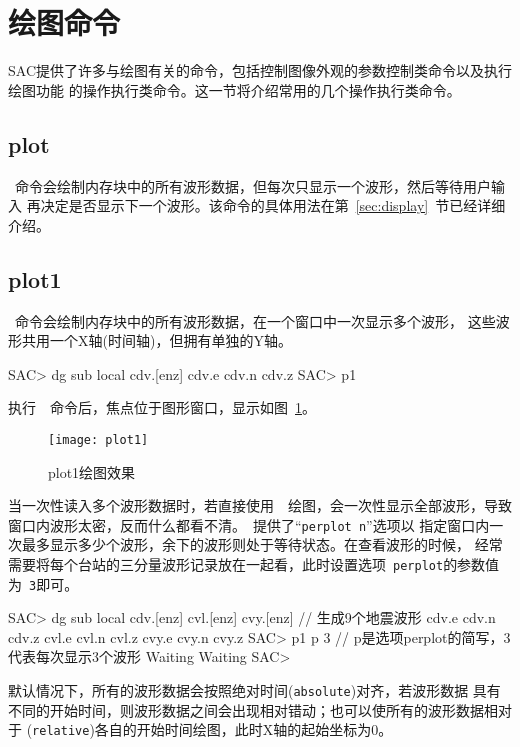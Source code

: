 \section{绘图命令}
SAC提供了许多与绘图有关的命令，包括控制图像外观的参数控制类命令以及执行绘图功能
的操作执行类命令。这一节将介绍常用的几个操作执行类命令。

\subsection{plot}
~命令会绘制内存块中的所有波形数据，但每次只显示一个波形，然后等待用户输入
再决定是否显示下一个波形。该命令的具体用法在第~\ref{sec:display}~节已经详细介绍。

\subsection{plot1}
~命令会绘制内存块中的所有波形数据，在一个窗口中一次显示多个波形，
这些波形共用一个X轴(时间轴)，但拥有单独的Y轴。

\begin{SACCode}
SAC> dg sub local cdv.[enz]
cdv.e cdv.n cdv.z
SAC> p1
\end{SACCode}

执行~~命令后，焦点位于图形窗口，显示如图~\ref{fig:plot1}。
\begin{figure}[H]
\centering
\texttt{[image: plot1]}
\caption{plot1绘图效果}
\label{fig:plot1}
\end{figure}

当一次性读入多个波形数据时，若直接使用~~绘图，会一次性显示全部波形，导致
窗口内波形太密，反而什么都看不清。~提供了``\verb+perplot n+''选项以
指定窗口内一次最多显示多少个波形，余下的波形则处于等待状态。在查看波形的时候，
经常需要将每个台站的三分量波形记录放在一起看，此时设置选项~\verb+perplot+的参数值为~\verb+3+即可。
\begin{SACCode}
SAC> dg sub local cdv.[enz] cvl.[enz] cvy.[enz]  // 生成9个地震波形
cdv.e cdv.n cdv.z cvl.e cvl.n cvl.z cvy.e cvy.n cvy.z
SAC> p1 p 3         // p是选项perplot的简写，3代表每次显示3个波形
Waiting
Waiting
SAC>
\end{SACCode}

默认情况下，所有的波形数据会按照绝对时间(\verb+absolute+)对齐，若波形数据
具有不同的开始时间，则波形数据之间会出现相对错动；也可以使所有的波形数据相对于
(\verb+relative+)各自的开始时间绘图，此时X轴的起始坐标为0。

